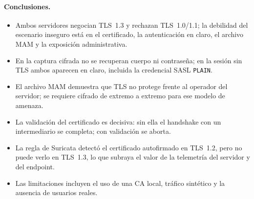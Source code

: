 \paragraph{Conclusiones.}
\begin{itemize}
	\item Ambos servidores negocian TLS~1.3 y rechazan TLS~1.0/1.1; la debilidad del escenario inseguro está en el certificado, la autenticación en claro, el archivo MAM y la exposición administrativa.
	\item En la captura cifrada no se recuperan cuerpo ni contraseña; en la sesión sin TLS ambos aparecen en claro, incluida la credencial SASL \texttt{PLAIN}.
	\item El archivo MAM demuestra que TLS no protege frente al operador del servidor; se requiere cifrado de extremo a extremo para ese modelo de amenaza.
	\item La validación del certificado es decisiva: sin ella el handshake con un intermediario se completa; con validación se aborta.
	\item La regla de Suricata detectó el certificado autofirmado en TLS~1.2, pero no puede verlo en TLS~1.3, lo que subraya el valor de la telemetría del servidor y del endpoint.
	\item Las limitaciones incluyen el uso de una CA local, tráfico sintético y la ausencia de usuarios reales.
\end{itemize}

